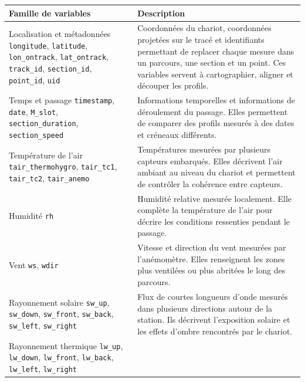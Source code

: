 \documentclass{article}
\begin{document}
\begin{table}[H]
\centering
\renewcommand{\arraystretch}{1.25}
\small
\begin{tabularx}{\textwidth}{p{}Y}
\toprule
\textbf{Famille de variables} & \textbf{Description} \\
\midrule
Localisation et métadonnées \newline \texttt{longitude}, \texttt{latitude}, \texttt{lon\_ontrack}, \texttt{lat\_ontrack}, \texttt{track\_id}, \texttt{section\_id}, \texttt{point\_id}, \texttt{uid} &
Coordonnées du chariot, coordonnées projetées sur le tracé et identifiants permettant de replacer chaque mesure dans un parcours, une section et un point. Ces variables servent à cartographier, aligner et découper les profils. \\
\addlinespace
Temps et passage \newline \texttt{timestamp}, \texttt{date}, \texttt{M\_slot}, \texttt{section\_duration}, \texttt{section\_speed} &
Informations temporelles et informations de déroulement du passage. Elles permettent de comparer des profils mesurés à des dates et créneaux différents. \\
\addlinespace
Température de l'air \newline \texttt{tair\_thermohygro}, \texttt{tair\_tc1}, \texttt{tair\_tc2}, \texttt{tair\_anemo} &
Températures mesurées par plusieurs capteurs embarqués. Elles décrivent l'air ambiant au niveau du chariot et permettent de contrôler la cohérence entre capteurs. \\
\addlinespace
Humidité \newline \texttt{rh} &
Humidité relative mesurée localement. Elle complète la température de l'air pour décrire les conditions ressenties pendant le passage. \\
\addlinespace
Vent \newline \texttt{ws}, \texttt{wdir} &
Vitesse et direction du vent mesurées par l'anémomètre. Elles renseignent les zones plus ventilées ou plus abritées le long des parcours. \\
\addlinespace
Rayonnement solaire \newline \texttt{sw\_up}, \texttt{sw\_down}, \texttt{sw\_front}, \texttt{sw\_back}, \texttt{sw\_left}, \texttt{sw\_right} &
Flux de courtes longueurs d'onde mesurés dans plusieurs directions autour de la station. Ils décrivent l'exposition solaire et les effets d'ombre rencontrés par le chariot. \\
\addlinespace
Rayonnement thermique \newline \texttt{lw\_up}, \texttt{lw\_down}, \texttt{lw\_front}, \texttt{lw\_back}, \texttt{lw\_left}, \texttt{lw\_right} &

\end{tabularx}
\end{table}
\end{document}
